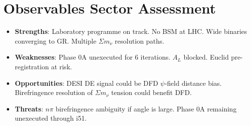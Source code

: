 \documentclass[11pt,a4paper]{article}
\begin{document}
\section{Observables Sector Assessment}

\begin{itemize}
\item \textbf{Strengths}: Laboratory programme on track. No BSM at LHC. Wide binaries converging to GR. Multiple $\Sigma m_\nu$ resolution paths.
\item \textbf{Weaknesses}: Phase 0A unexecuted for 6 iterations. $A_L$ blocked. Euclid pre-registration at risk.
\item \textbf{Opportunities}: DESI DE signal could be DFD $\psi$-field distance bias. Birefringence resolution of $\Sigma m_\nu$ tension could benefit DFD.
\item \textbf{Threats}: $n\pi$ birefringence ambiguity if angle is large. Phase 0A remaining unexecuted through i51.
\end{itemize}
\end{document}
